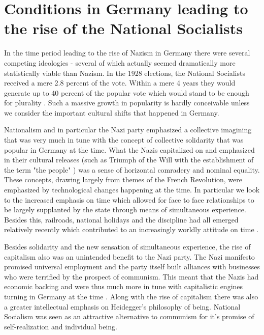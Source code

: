 \documentclass[a4paper, 11pt]{article} %
\begin{document}


\section*{Conditions in Germany leading to the rise of the National Socialists}

In the time period leading to the rise of Nazism in Germany there were several competing ideologies - several of which actually seemed dramatically more statistically viable than Nazism.  In the 1928 elections, the National Socialists received a mere 2.8 percent of the vote\cite{Lecture3}.  Within a mere 4 years they would generate up to 40 percent of the popular vote which would stand to be enough for plurality \cite{Lecture3}.  Such a massive growth in popularity is hardly conceivable unless we consider the important cultural shifts that happened in Germany.  

Nationalism and in particular the Nazi party emphasized a collective imagining that was very much in tune with the concept of collective solidarity that was popular in Germany at the time.  What the Nazis capitalized on and emphasized in their cultural releases (such as Triumph of the Will with the establishment of the term "the people" \cite{TriumphFilm}) was a sense of horizontal comradery and nominal equality.  These concepts, drawing largely from themes of the French Revolution, were emphasized by technological changes happening at the time.  In particular we look to the increased emphasis on time which allowed for face to face relationships to be largely supplanted by the state through means of simultaneous experience.  Besides this, railroads, national holidays and the discipline had all emerged relatively recently which contributed to an increasingly worldly attitude on time \cite{Lecture3}.  

Besides solidarity and the new sensation of simultaneous experience, the rise of capitalism also was an unintended benefit to the Nazi party.  The Nazi manifesto promised universal employment and the party itself built alliances with businesses who were terrified by the prospect of communism.  This meant that the Nazis had economic backing and were thus much more in tune with capitalistic engines turning in Germany at the time \cite{Lecture3}.  Along with the rise of capitalism there was also a greater intellectual emphasis on Heidegger's philosophy of being.  National Socialism was seen as an attractive  alternative to communism for it's promise of self-realization and individual being.  
\end{document}
